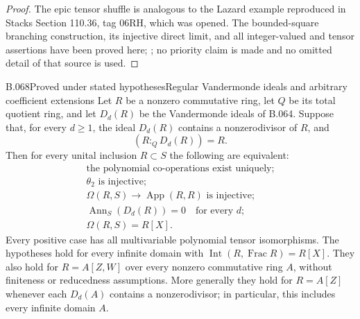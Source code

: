 \begin{proof}
The epic tensor shuffle is analogous to the
Lazard example reproduced in Stacks Section
110.36, tag 06RH, which was opened. The
bounded-square branching construction, its
injective direct limit, and all integer-valued
and tensor assertions have been proved here;
\cite{StacksEpicExamples}; no priority claim is made and no omitted
detail of that source is used.
\end{proof}

\begin{saresult}{B.068}{Proved under stated hypotheses}{Regular Vandermonde ideals and arbitrary coefficient extensions}
Let $R$ be a nonzero commutative ring, let $Q$ be its total quotient ring,
and let $D_d(R)$ be the Vandermonde ideals of B.064. Suppose that, for every
$d\ge1$, the ideal $D_d(R)$ contains a nonzerodivisor of $R$, and
\[
                         (R:_Q D_d(R))=R.                 \tag{B68.1}
\]
Then for every unital inclusion $R\subset S$ the following are equivalent:
\[
\begin{gathered}
 \text{the polynomial co-operations exist uniquely};\\
 \theta_2\text{ is injective};\\
 \Omega(R,S)\longrightarrow\operatorname{App}(R,R)
       \text{ is injective};\\
 \operatorname{Ann}_S(D_d(R))=0\quad\text{for every }d;\\
 \Omega(R,S)=R[X].                                         \tag{B68.2}
\end{gathered}
\]
Every positive case has all multivariable polynomial tensor isomorphisms.
The hypotheses hold for every infinite domain with
$\operatorname{Int}(R,\operatorname{Frac}R)=R[X]$.
They also hold for $R=A[Z,W]$ over every nonzero commutative ring $A$,
without finiteness or reducedness assumptions. More generally they hold
for $R=A[Z]$ whenever each $D_d(A)$ contains a nonzerodivisor; in particular,
this includes every infinite domain $A$.
\end{saresult}
